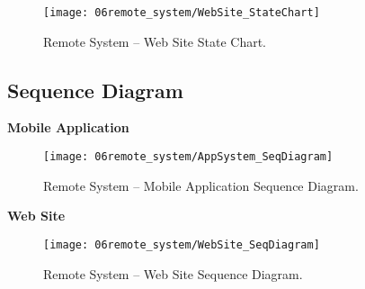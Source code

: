 \begin{figure}[H]
        \centering
        \texttt{[image: 06remote\_system/WebSite\_StateChart]}
        \caption{Remote System – Web Site State Chart.}
        \label{fig:StateChart_WebSite}
\end{figure}

\subsection{Sequence Diagram}
\textbf{Mobile Application}

\begin{figure}[H]
        \centering
        \texttt{[image: 06remote\_system/AppSystem\_SeqDiagram]}
        \caption{Remote System – Mobile Application Sequence Diagram.}
        \label{fig:SeqDiagram_application}
\end{figure}

\textbf{Web Site}

\begin{figure}[H]
        \centering
        \texttt{[image: 06remote\_system/WebSite\_SeqDiagram]}
        \caption{Remote System – Web Site Sequence Diagram.}
        \label{fig:SeqDiagram_WebSite}
\end{figure}